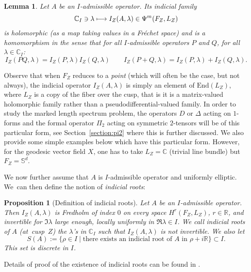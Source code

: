 \documentclass[JEP,XML,SOM,Unicode,NoFloatCountersInSection]{cedram}
\newcommand\mto{\mathchoice{\longmapsto}{\mapsto}{\mapsto}{\mapsto}}
\newcommand{\C}{\mathbb{C}}
\newcommand{\R}{\mathbb{R}}
\newcommand{\Ss}{\mathbb{S}}
\theoremstyle{plain}
\newtheorem{lemma}{Lemma}[section]
\newtheorem{proposition}{Proposition}[section]
\theoremstyle{definition}
\begin{document}
\begin{lemma}
\label{lemma:homomorphism}
Let $A$ be an $I$-admissible operator. Its indicial family
\[
\C_I \ni \lambda \mto I_Z(A,\lambda) \in \Psi^m(F_Z,L_Z)
\]
is holomorphic (as a map taking values in a Fréchet space) and is a homomorphism in the sense that for all $I$-admissible operators $P$ and $Q$, for all $\lambda \in \C_I$:
\[
I_Z(PQ,\lambda) = I_Z(P,\lambda) I_Z(Q,\lambda) \qquad I_Z(P+Q,\lambda) = I_Z(P,\lambda) + I_Z(Q,\lambda).
\]
\end{lemma}

Observe that when $F_Z$ reduces to a \emph{point} (which will often be the case, but not always), the indicial operator $I_Z(A,\lambda)$ is simply an element of $\mathrm{End}(L_Z)$, where $L_Z$ is a copy of the fiber over the cusp, that is it is a matrix-valued holomorphic family rather than a pseudodifferential-valued family. In order to study the marked length spectrum problem, the operators $D$ or $\Delta$ acting on $1$-forms and the formal operator $\Pi_2$ acting on symmetric $2$-tensors will be of this particular form, see Section~\ref{section:pi2} where this is further discussed. We also provide some simple examples below which have this particular form. However, for the geodesic vector field $X$, one has to take $L_Z = \C$ (trivial line bundle) but $F_Z = \Ss^d$.

We now further assume that $A$ is $I$-admissible operator and uniformly elliptic. We~can then define the notion of \emph{indicial roots}:

\begin{proposition}[Definition of indicial roots]
\label{prop:indicial-resolvent-elliptic}
Let $A$ be an $I$-admissible operator. Then $I_Z(A,\lambda)$ is Fredholm of index $0$ on every space $H^r(F_Z,L_Z)$, $r \in \R$, and invertible for $\Im\lambda$ large enough, locally uniformly in $\Re \lambda\in I$. We call \emph{indicial roots} of $A$ (at~cusp~$Z$) the $\lambda$'s in $\C_I$ such that $I_Z(A,\lambda)$ is not invertible. We also let
\begin{equation}\label{eq:def-S}
S(A):=\{ \rho \in I \mid \text{there exists an indicial root of $A$ in $\rho + i \R$}\} \subset I.
\end{equation}
This set is discrete in $I$.
\end{proposition}

Details of proof of the existence of indicial roots can be found in \cite[\S 4.2.2]{Bonthonneau-Lefeuvre-19-1}.
\end{document}
